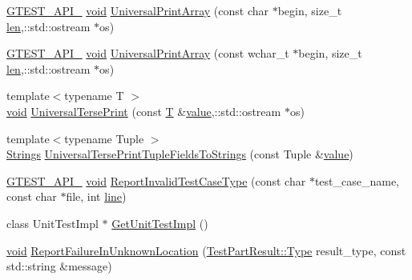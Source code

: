 \begin{DoxyCompactItemize}
\item 
\hyperlink{ts__gtest_8h_aa73be6f0ba4a7456180a94904ce17790}{G\-T\-E\-S\-T\-\_\-\-A\-P\-I\-\_\-} \hyperlink{legacy_8hpp_a8bb47f092d473522721002c86c13b94e}{void} \hyperlink{namespacetesting_1_1internal_a3fac293aeb6e7e6b3ff3e27404f6588b}{Universal\-Print\-Array} (const char $\ast$begin, size\-\_\-t \hyperlink{core__c_8h_accb79be93f4fbcaa15b5a7670569c9f8}{len},\-::std\-::ostream $\ast$os)
\item 
\hyperlink{ts__gtest_8h_aa73be6f0ba4a7456180a94904ce17790}{G\-T\-E\-S\-T\-\_\-\-A\-P\-I\-\_\-} \hyperlink{legacy_8hpp_a8bb47f092d473522721002c86c13b94e}{void} \hyperlink{namespacetesting_1_1internal_ae95ea0aea80977c0870df98b27a17cac}{Universal\-Print\-Array} (const wchar\-\_\-t $\ast$begin, size\-\_\-t \hyperlink{core__c_8h_accb79be93f4fbcaa15b5a7670569c9f8}{len},\-::std\-::ostream $\ast$os)
\item 
{\footnotesize template$<$typename T $>$ }\\\hyperlink{legacy_8hpp_a8bb47f092d473522721002c86c13b94e}{void} \hyperlink{namespacetesting_1_1internal_ab3d834fb6c31d29e36400cc19905294b}{Universal\-Terse\-Print} (const \hyperlink{calib3d_8hpp_a3efb9551a871ddd0463079a808916717}{T} \&\hyperlink{highgui__c_8h_ad4670c92695d4327c21292905a803901}{value},\-::std\-::ostream $\ast$os)
\item 
{\footnotesize template$<$typename Tuple $>$ }\\\hyperlink{namespacetesting_1_1internal_a7706b17f05f4b49e351b052ae4e05073}{Strings} \hyperlink{namespacetesting_1_1internal_a7e60d1478b074801c766eeee9be6c772}{Universal\-Terse\-Print\-Tuple\-Fields\-To\-Strings} (const Tuple \&\hyperlink{highgui__c_8h_ad4670c92695d4327c21292905a803901}{value})
\item 
\hyperlink{ts__gtest_8h_aa73be6f0ba4a7456180a94904ce17790}{G\-T\-E\-S\-T\-\_\-\-A\-P\-I\-\_\-} \hyperlink{legacy_8hpp_a8bb47f092d473522721002c86c13b94e}{void} \hyperlink{namespacetesting_1_1internal_a864171ad4983f5b8e4258d0d5db0c03b}{Report\-Invalid\-Test\-Case\-Type} (const char $\ast$test\-\_\-case\-\_\-name, const char $\ast$file, int \hyperlink{legacy_8hpp_a5a869825573cfaf8861a6ec0fe0f262f}{line})
\item 
class Unit\-Test\-Impl $\ast$ \hyperlink{namespacetesting_1_1internal_a6211ab15f810f84dd40f111f5b4c9b32}{Get\-Unit\-Test\-Impl} ()
\item 
\hyperlink{legacy_8hpp_a8bb47f092d473522721002c86c13b94e}{void} \hyperlink{namespacetesting_1_1internal_a85f6ff0e40f9a5f10af66a73cf1364fa}{Report\-Failure\-In\-Unknown\-Location} (\hyperlink{classtesting_1_1TestPartResult_a65ae656b33fdfdfffaf34858778a52d5}{Test\-Part\-Result\-::\-Type} result\-\_\-type, const std\-::string \&message)

\end{DoxyCompactItemize}
